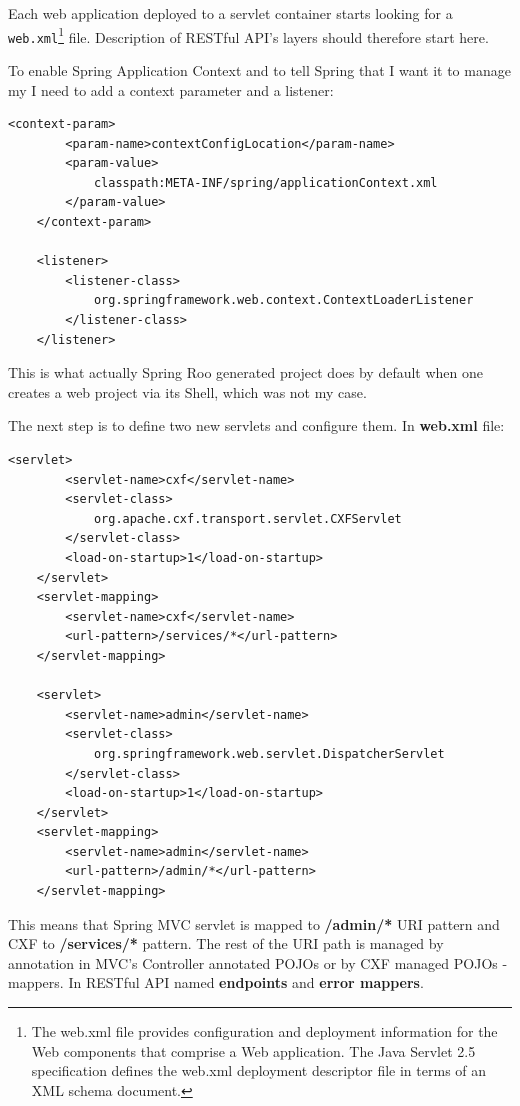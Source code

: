 	Each web application deployed to a servlet container starts looking for a \verb|web.xml|\footnote{The web.xml file
	provides configuration and deployment information for the Web components that comprise a Web application. The Java
	Servlet 2.5 specification defines the web.xml deployment descriptor file in terms of an XML schema document.} file.
	Description of RESTful API's layers should therefore start here.
	
	To enable Spring Application Context and to tell Spring that I want it to manage my I need to add a context parameter
	and a listener:
	
	\lstset{language=XML}
	\begin{lstlisting}[tabsize=2]
	<context-param>
		<param-name>contextConfigLocation</param-name>
		<param-value>
			classpath:META-INF/spring/applicationContext.xml
		</param-value>
	</context-param>

	<listener>
		<listener-class>
			org.springframework.web.context.ContextLoaderListener
		</listener-class>
	</listener>
	\end{lstlisting}
	
	This is what actually Spring Roo generated project does by default when one creates a web project via its Shell, which
	was not my case.
	
	The next step is to define two new servlets and configure them. In \textbf{web.xml} file:
	
	\begin{lstlisting}[tabsize=2]
	<servlet>
		<servlet-name>cxf</servlet-name>
		<servlet-class>
			org.apache.cxf.transport.servlet.CXFServlet
		</servlet-class>
		<load-on-startup>1</load-on-startup>
	</servlet>
	<servlet-mapping>
		<servlet-name>cxf</servlet-name>
		<url-pattern>/services/*</url-pattern>
	</servlet-mapping>

	<servlet>
		<servlet-name>admin</servlet-name>
		<servlet-class>
			org.springframework.web.servlet.DispatcherServlet
		</servlet-class>
		<load-on-startup>1</load-on-startup>
	</servlet>
	<servlet-mapping>
		<servlet-name>admin</servlet-name>
		<url-pattern>/admin/*</url-pattern>
	</servlet-mapping>
	\end{lstlisting}
	
	This means that Spring MVC servlet is mapped to \textbf{/admin/*} URI pattern and CXF to \textbf{/services/*} pattern.
	The rest of the URI path is managed by annotation in MVC's Controller annotated POJOs or by CXF managed POJOs -
	mappers. In RESTful API named \textbf{endpoints} and \textbf{error mappers}.
	
